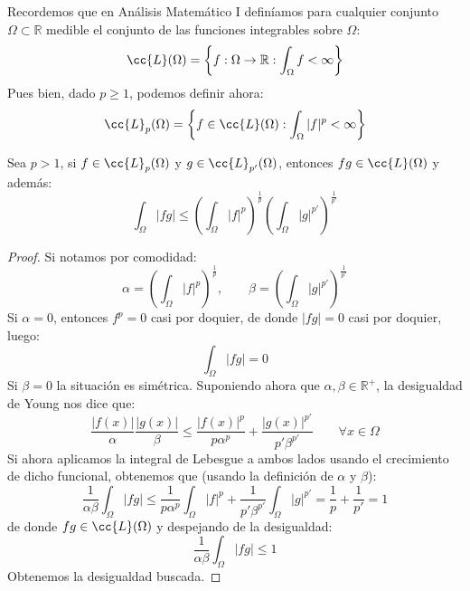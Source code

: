 \noindent
Recordemos que en Análisis Matemático I definíamos para cualquier conjunto $\Omega\subset \mathbb{R}$ medible el conjunto de las funciones integrables sobre $\Omega$:
\begin{equation*}
    \cc{L}(\Omega) = \left\{f:\Omega\to \mathbb{R} : \int_\Omega f < \infty\right\}
\end{equation*}
Pues bien, dado $p\geq 1$, podemos definir ahora:
\begin{equation*}
    \cc{L}_p(\Omega) = \left\{f\in \cc{L}(\Omega) : \int_\Omega |f|^p < \infty\right\}
\end{equation*}

\begin{teo}
    Sea $p>1$, si $f\in \cc{L}_p(\Omega)$ y $g\in \cc{L}_{p'}(\Omega)$, entonces $fg\in \cc{L}(\Omega)$ y además:
    \begin{equation*}
        \int_\Omega |fg| \leq {\left(\int_\Omega |f|^p\right)}^{\frac{1}{p}}{\left(\int_\Omega |g|^{p'}\right)}^{\frac{1}{p'}}
    \end{equation*}
    \begin{proof}
        Si notamos por comodidad:
        \begin{equation*}
            \alpha = {\left(\int_\Omega |f|^p\right)}^{\frac{1}{p}},  \qquad \beta ={\left(\int_\Omega |g|^{p'}\right)}^{\frac{1}{p'}}
        \end{equation*}
        Si $\alpha = 0$, entonces $f^p = 0$ casi por doquier, de donde $|fg| = 0$ casi por doquier, luego:
        \begin{equation*}
            \int_\Omega|fg| = 0
        \end{equation*}
        Si $\beta = 0$ la situación es simétrica. Suponiendo ahora que $\alpha,\beta\in \mathbb{R}^+$, la desigualdad de Young nos dice que:
        \begin{equation*}
            \dfrac{|f(x)|}{\alpha} \dfrac{|g(x)|}{\beta}\leq \dfrac{|f(x)|^p}{p\alpha^p} + \dfrac{|g(x)|^{p'}}{p' \beta^{p'}} \qquad \forall x\in \Omega
        \end{equation*}
        Si ahora aplicamos la integral de Lebesgue a ambos lados usando el crecimiento de dicho funcional, obtenemos que (usando la definición de $\alpha$ y $\beta$):
        \begin{equation*}
            \dfrac{1}{\alpha\beta} \int_\Omega |fg| \leq \dfrac{1}{p\alpha^p} \int_\Omega |f|^p + \dfrac{1}{p'\beta^{p'}} \int_\Omega |g|^{p'} = \dfrac{1}{p} + \dfrac{1}{p'} = 1
        \end{equation*}
        de donde $fg\in \cc{L}(\Omega)$ y despejando de la desigualdad:
        \begin{equation*}
            \dfrac{1}{\alpha\beta} \int_\Omega |fg| \leq 1
        \end{equation*}
        Obtenemos la desigualdad buscada.
    \end{proof}
\end{teo}

